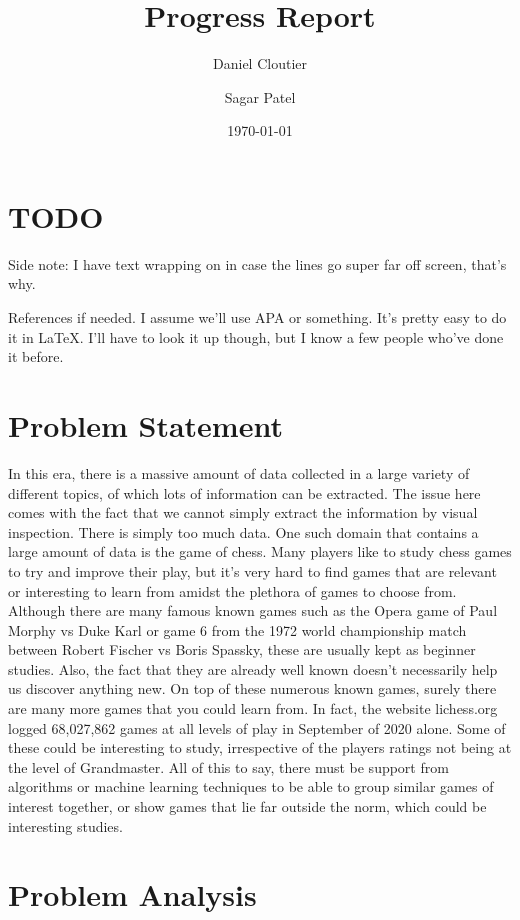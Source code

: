 \documentclass[12pt]{article}
\title{Progress Report}
\author{Daniel Cloutier \and Sagar Patel}
\date{\today}
\begin{document}
    \begin{singlespace}
        \maketitle 
    \end{singlespace}

    \section{TODO}
    Side note: I have text wrapping on in case the lines go super far off screen, that's why.

    References if needed. I assume we'll use APA or something. It's pretty easy to do it in LaTeX. I'll have to look it up though, but I know a few people who've done it before.

    \section{Problem Statement}

    In this era, there is a massive amount of data collected in a large variety of different topics, of which lots of information can be extracted. The issue here comes with the fact that we cannot simply extract the information by visual inspection. There is simply too much data. One such domain that contains a large amount of data is the game of chess. Many players like to study chess games to try and improve their play, but it's very hard to find games that are relevant or interesting to learn from amidst the plethora of games to choose from. Although there are many famous known games such as the Opera game of Paul Morphy vs Duke Karl or game 6 from the 1972 world championship match between Robert Fischer vs Boris Spassky, these are usually kept as beginner studies. Also, the fact that they are already well known doesn't necessarily help us discover anything new. On top of these numerous known games, surely there are many more games that you could learn from. In fact, the website lichess.org logged 68,027,862 games at all levels of play in September of 2020 alone. Some of these could be interesting to study, irrespective of the players ratings not being at the level of Grandmaster. All of this to say, there must be support from algorithms or machine learning techniques to be able to group similar games of interest together, or show games that lie far outside the norm, which could be interesting studies.

    \section{Problem Analysis}
\end{document}
